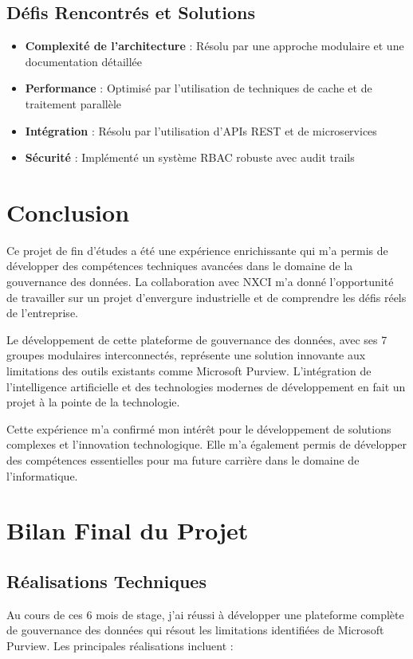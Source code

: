 \documentclass[12pt,a4paper]{article}
\begin{document}
\subsection{Défis Rencontrés et Solutions}
\begin{itemize}
    \item \textbf{Complexité de l'architecture} : Résolu par une approche modulaire et une documentation détaillée
    \item \textbf{Performance} : Optimisé par l'utilisation de techniques de cache et de traitement parallèle
    \item \textbf{Intégration} : Résolu par l'utilisation d'APIs REST et de microservices
    \item \textbf{Sécurité} : Implémenté un système RBAC robuste avec audit trails
\end{itemize}

\section{Conclusion}

Ce projet de fin d'études a été une expérience enrichissante qui m'a permis de développer des compétences techniques avancées dans le domaine de la gouvernance des données. La collaboration avec NXCI m'a donné l'opportunité de travailler sur un projet d'envergure industrielle et de comprendre les défis réels de l'entreprise.

Le développement de cette plateforme de gouvernance des données, avec ses 7 groupes modulaires interconnectés, représente une solution innovante aux limitations des outils existants comme Microsoft Purview. L'intégration de l'intelligence artificielle et des technologies modernes de développement en fait un projet à la pointe de la technologie.

Cette expérience m'a confirmé mon intérêt pour le développement de solutions complexes et l'innovation technologique. Elle m'a également permis de développer des compétences essentielles pour ma future carrière dans le domaine de l'informatique.

\section{Bilan Final du Projet}

\subsection{Réalisations Techniques}
Au cours de ces 6 mois de stage, j'ai réussi à développer une plateforme complète de gouvernance des données qui résout les limitations identifiées de Microsoft Purview. Les principales réalisations incluent :
\end{document}
